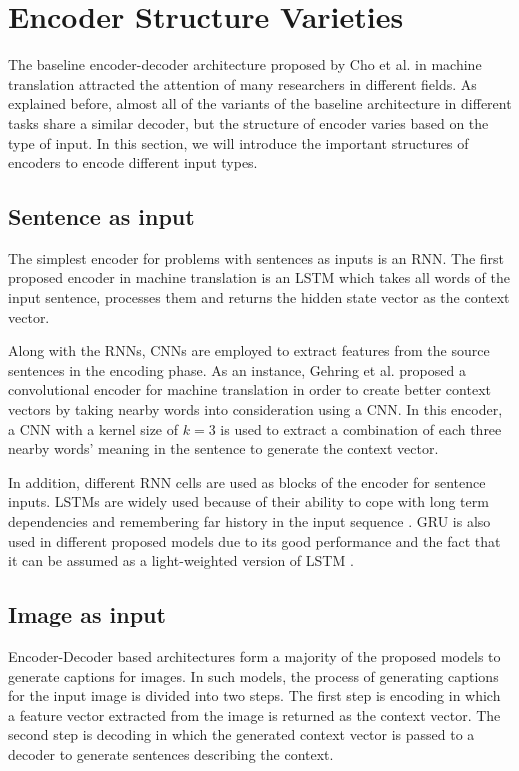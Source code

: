 \documentclass[preprint, 12pt]{elsarticle}
\begin{document}
		
	\section{Encoder Structure Varieties}
	The baseline encoder-decoder architecture proposed by Cho et al. \cite{cho2014learning} in machine translation attracted the attention of many researchers in different fields. As explained before, almost all of the variants of the baseline architecture in different tasks share a similar decoder, but the structure of encoder varies based on the type of input. In this section, we will introduce the important structures of encoders to encode different input types.
		\subsection{Sentence as input}
		The simplest encoder for problems with sentences as inputs is an RNN. The first proposed encoder in machine translation is an LSTM which takes all words of the input sentence, processes them and returns the hidden state vector as the context vector. 
		
		Along with the RNNs, CNNs are employed to extract features from the source sentences in the encoding phase. As an instance, Gehring et al. proposed a convolutional encoder for machine translation in order to create better context vectors by taking nearby words into consideration using a CNN\cite{gehring2016convolutional}. In this encoder, a CNN with a kernel size of $k = 3$ is used to extract a combination of each three nearby words' meaning in the sentence to generate the context vector. 
		
		In addition, different RNN cells are used as blocks of the encoder for sentence inputs. LSTMs\cite{hochreiter1997long} are widely used because of their ability to cope with long term dependencies and remembering far history in the input sequence \cite{sutskever2014sequence}\cite{bahdanau2014neural}\cite{luong2015stanford}\cite{xu2015show}. GRU \cite{cho2014learning} is also used in different proposed models due to its good performance and the fact that it can be assumed as a light-weighted version of LSTM \cite{cho2014learning}\cite{mi2016coverage}\cite{he2016dual}\cite{tu2017context}.
		\subsection{Image as input}
		Encoder-Decoder based architectures form a majority of the proposed models to generate captions for images. In such models, the process of generating captions for the input image is divided into two steps. The first step is encoding in which a feature vector extracted from the image is returned as the context vector. The second step is decoding in which the generated context vector is passed to a decoder to generate sentences describing the context. 
		
\end{document}

